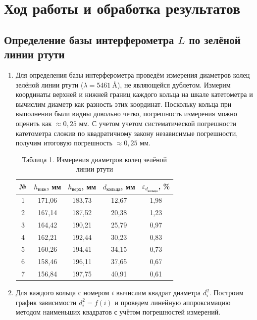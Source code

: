 \documentclass[a4paper]{article}
\begin{document}
\section{Ход работы и обработка результатов}

\subsection{Определение базы интерферометра $L$ по зелёной линии ртути}

\begin{enumerate}

\item Для определения базы интерферометра проведём измерения диаметров колец зелёной линии ртути ($\lambda = 5461~\text{\AA}$), не являющейся дублетом. Измерим координаты верхней и нижней границ каждого кольца на шкале катетометра и вычислим диаметр как разность этих координат. Поскольку кольца при выполнении были видны довольно четко, погрешность измерения можно оценить как $\approx 0,25$ мм. С учетом учетом систематической погрешности катетометра сложив по квадратичному закону независимые погрешности, получим итоговую погрешность $\approx 0,25$ мм.

\begin{table}[h!]
    \centering
    \begin{tabular}{|c|c|c|c|c|}
        \hline
        № & $h_{\text{ниж}}$, мм & $h_{\text{верх}}$, мм & $d_{\text{кольца}}$, мм & $\varepsilon_{d_{\text{кольца}}}$, \% \\ \hline
        1 & 171,06 & 183,73 & 12,67 & 1,98 \\ \hline
        2 & 167,14 & 187,52 & 20,38 & 1,23 \\ \hline
        3 & 164,42 & 190,21 & 25,79 & 0,97 \\ \hline
        4 & 162,21 & 192,44 & 30,23 & 0,83 \\ \hline
        5 & 160,26 & 194,41 & 34,15 & 0,73 \\ \hline
        6 & 158,46 & 196,11 & 37,65 & 0,67 \\ \hline
        7 & 156,84 & 197,75 & 40,91 & 0,61 \\ \hline
    \end{tabular}
    \caption{Таблица 1. Измерения диаметров колец зелёной линии ртути}
    \label{tab:hg_green}
\end{table}

\item Для каждого кольца с номером $i$ вычислим квадрат диаметра $d_i^2$. Построим график зависимости $d_i^2 = f(i)$ и проведем линейную аппроксимацию методом наименьших квадратов с учётом погрешностей измерений. 


\end{enumerate}
\end{document}

